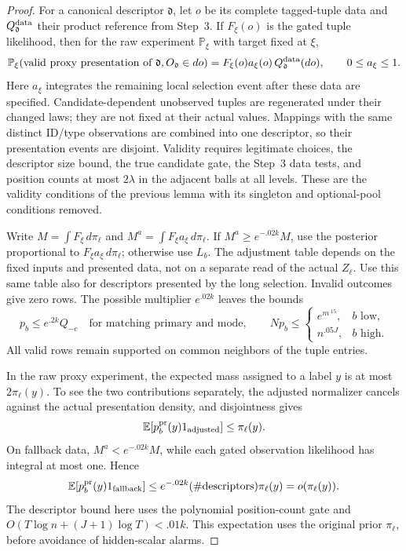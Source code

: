 \begin{proof}
For a canonical descriptor \(\mathfrak d\), let \(o\) be its complete
tagged-tuple data and \(Q_{\mathfrak d}^{\rm data}\) their product
reference from Step~3. If \(F_\xi(o)\) is the gated tuple likelihood,
then for the raw experiment \(\mathbb P_\xi\) with target fixed at
\(\xi\),
\[
 \mathbb P_\xi(\text{valid proxy presentation of }\mathfrak d,
                  O_{\mathfrak d}\in do)
 =F_\xi(o)a_\xi(o)\,Q_{\mathfrak d}^{\rm data}(do),
 \qquad 0\le a_\xi\le1.
\]
Here \(a_\xi\) integrates the remaining local selection event after
these data are specified. Candidate-dependent unobserved tuples are
regenerated under their changed laws; they are not fixed at their actual
values. Mappings with the same distinct ID/type observations are combined
into one descriptor, so their presentation events are disjoint.
Validity requires legitimate choices, the descriptor size bound, the
true candidate gate, the Step~3 data tests, and position counts at most
\(2\lambda\) in the adjacent balls at all levels. These are the validity
conditions of the previous lemma with its singleton and optional-pool
conditions removed.

Write \(M=\int F_\xi\,d\pi_\ell\) and
\(M^a=\int F_\xi a_\xi\,d\pi_\ell\).
If \(M^a\ge e^{-.02k}M\), use the posterior proportional to
\(F_\xi a_\xi\,d\pi_\ell\); otherwise use \(L_b\).
The adjustment table depends on the fixed inputs and presented data,
not on a separate read of the actual \(Z_\ell\). Use this same table
also for descriptors presented by the long selection. Invalid outcomes
give zero rows. The possible multiplier \(e^{.02k}\) leaves the bounds
\[
 p_b\le e^{.2k}Q_{-c}\quad\text{for matching primary and mode},
 \qquad
 Np_b\le
 \begin{cases}e^{m^{.15}},&b\text{ low},\\n^{.05J},&b\text{ high}.
 \end{cases}
\]
All valid rows remain supported on common neighbors of the tuple entries.

In the raw proxy experiment, the expected mass assigned to a label \(y\)
is at most \(2\pi_\ell(y)\). To see the two contributions separately,
the adjusted normalizer cancels against the actual presentation density,
and disjointness gives
\[
 \mathbb E[p_b^{\rm pr}(y)1_{\rm adjusted}]\le\pi_\ell(y).
\]
On fallback data, \(M^a<e^{-.02k}M\), while each gated observation
likelihood has integral at most one. Hence
\[
 \mathbb E[p_b^{\rm pr}(y)1_{\rm fallback}]
 \le e^{-.02k}(\#\text{descriptors})\pi_\ell(y)=o(\pi_\ell(y)).
\]
The descriptor bound here uses the polynomial position-count gate and
\(O(T\log n+(J+1)\log T)<.01k\). This expectation uses the original
prior \(\pi_\ell\), before avoidance of hidden-scalar alarms.


\end{proof}
